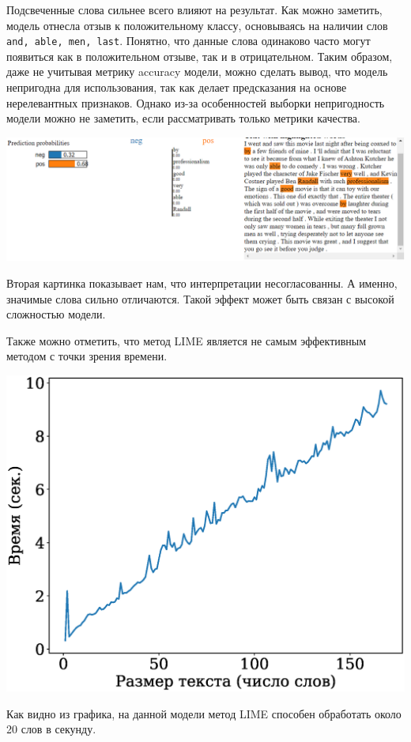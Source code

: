 \documentclass[a4paper, 12pt]{article}
\begin{document}
Подсвеченные слова сильнее всего влияют на результат. Как можно заметить, модель отнесла отзыв к положительному классу, основываясь на наличии слов \texttt{and, able, men, last}. Понятно, что данные слова одинаково часто могут появиться как в положительном отзыве, так и в отрицательном. Таким образом, даже не учитывая метрику accuracy модели, можно сделать вывод, что модель непригодна для использования, так как делает предсказания на основе нерелевантных признаков. Однако из-за особенностей выборки непригодность модели можно не заметить, если рассматривать только метрики качества. 

\includegraphics[width=\textwidth]{figures/lime_exp2.png}

Вторая картинка показывает нам, что интерпретации несогласованны. А именно, значимые слова сильно отличаются. Такой эффект может быть связан с высокой сложностью модели.

Также можно отметить, что метод LIME является не самым эффективным методом с точки зрения времени.

\includegraphics[scale=0.5]{../figures/lime_time}

Как видно из графика, на данной модели метод LIME способен обработать около 20 слов в секунду.
\end{document}
